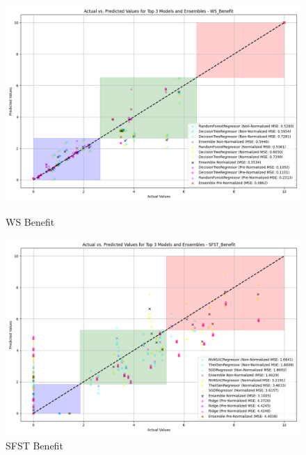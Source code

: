 \begin{figure}[H]
    \centering
    \begin{minipage}{0.45\textwidth}
        \centering
        \includegraphics[width=\linewidth]{reg_section_specific/ensemble_learning/actual_vs_predicted_top_3_models_and_ensembles_WS_Benefit.png}
        \caption{WS Benefit}
        \label{reg_spec_fig:ws_ben_ensemble}
    \end{minipage}\hfill
    \begin{minipage}{0.45\textwidth}
        \centering
        \includegraphics[width=\linewidth]{reg_section_specific/ensemble_learning/actual_vs_predicted_top_3_models_and_ensembles_SFST_Benefit.png}
        \caption{SFST Benefit}
        \label{reg_spec_fig:sfst_ben_ensemble}
    \end{minipage}
\end{figure}
